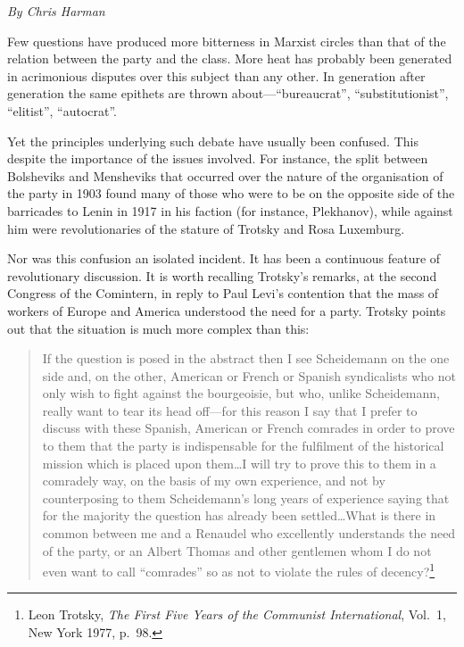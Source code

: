 \emph{By Chris Harman}

Few questions have produced more bitterness in Marxist circles than that of the relation between the party and the class. More heat has probably been generated in acrimonious disputes over this subject than any other. In generation after generation the same epithets are thrown about---``bureaucrat'', ``substitutionist'', ``elitist'', ``autocrat''.

Yet the principles underlying such debate have usually been confused. This despite the importance of the issues involved. For instance, the split between Bolsheviks and Mensheviks that occurred over the nature of the organisation of the party in 1903 found many of those who were to be on the opposite side of the barricades to Lenin in 1917 in his faction (for instance, Plekhanov), while against him were revolutionaries of the stature of Trotsky and Rosa Luxemburg.

Nor was this confusion an isolated incident. It has been a continuous feature of revolutionary discussion. It is worth recalling Trotsky's remarks, at the second Congress of the Comintern, in reply to Paul Levi's contention that the mass of workers of Europe and America understood the need for a party. Trotsky points out that the situation is much more complex than this:

\blockquote{If the question is posed in the abstract then I see Scheidemann on the one side and, on the other, American or French or Spanish syndicalists who not only wish to fight against the bourgeoisie, but who, unlike Scheidemann, really want to tear its head off---for this reason I say that I prefer to discuss with these Spanish, American or French comrades in order to prove to them that the party is indispensable for the fulfilment of the historical mission which is placed upon them\ldots I will try to prove this to them in a comradely way, on the basis of my own experience, and not by counterposing to them Scheidemann's long years of experience saying that for the majority the question has already been settled\ldots What is there in common between me and a Renaudel who excellently understands the need of the party, or an Albert Thomas and other gentlemen whom I do not even want to call ``comrades'' so as not to violate the rules of decency?\footnote{Leon Trotsky, \emph{The First Five Years of the Communist International}, Vol.~1, New York 1977, p.~98.}}

